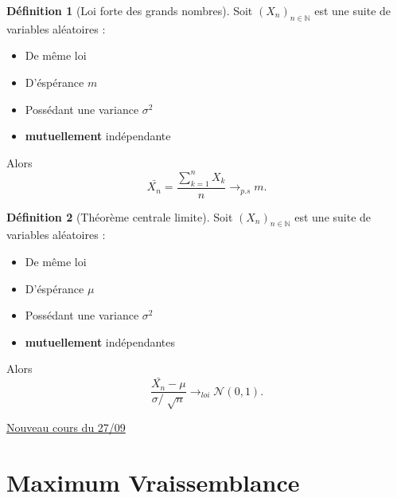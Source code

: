 \documentclass{article}
\theoremstyle{plain}%
\theoremstyle{definition}
\newtheorem{defn}{Définition}[section]
\theoremstyle{remark}
\begin{document}
\begin{defn}[Loi forte des grands nombres]
    Soit $ (X_n)_{n \in \mathbb{N}} $ est une suite de variables aléatoires :\begin{itemize}
        \item De même loi
        \item D'éspérance $ m $ 
        \item Possédant une variance $ \sigma ^2 $ 
        \item \textbf{mutuellement} indépendante
    \end{itemize}
    Alors 
    \[
        \bar{X_n} = \frac{\sum_{k=1}^{n} X_k}{n} \to _{p.s} m
    .\]
\end{defn}

\begin{defn}[Théorème centrale limite]
    Soit $ (X_n)_{n \in \mathbb{N}} $ est une suite de variables aléatoires :\begin{itemize}
        \item De même loi
        \item D'éspérance $ \mu  $ 
        \item Possédant une variance $ \sigma ^2 $ 
        \item \textbf{mutuellement} indépendantes
    \end{itemize}
    Alors 
    \[
        \frac{\bar{X_n} - \mu }{\sigma / \sqrt[]{n}} \to_{loi} \mathcal{N}(0,1)
    .\]
\end{defn}

\underline{Nouveau cours du 27/09} \\

\section{Maximum Vraissemblance}
\end{document}
